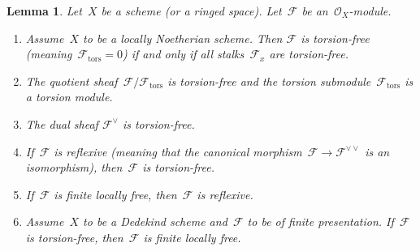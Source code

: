 \documentclass[10pt,reqno,a4paper]{amsbook}
\theoremstyle{definition}
\theoremstyle{plain}
\newtheorem{lemma}[defn]{Lemma}
\theoremstyle{remark}
\newcommand{\F}{\mathcal{F}}
\renewcommand{\O}{\mathcal{O}}
\newcommand{\tors}{\mathrm{tors}}
\newcommand{\?}{\,{:}\,}
\renewcommand{\_}{\mathpunct{.}\,}
\begin{document}
\begin{lemma}\label{lemma:torsion-stuff}
Let~$X$ be a scheme (or a ringed space). Let~$\F$ be
an~$\O_X$-module.
\begin{enumerate}
\item Assume~$X$ to be a locally Noetherian scheme. Then $\F$ is torsion-free
(meaning~$\F_\tors = 0$) if and only if all stalks~$\F_x$ are torsion-free.
\item The quotient sheaf~$\F/\F_\tors$ is torsion-free and the torsion
submodule~$\F_\tors$ is a torsion module.
\item The dual sheaf $\F^\vee$ is torsion-free.
\item If~$\F$ is reflexive (meaning that the canonical morphism~$\F \to
\F^{\vee\vee}$ is an isomorphism), then~$\F$ is torsion-free.
\item If~$\F$ is finite locally free, then~$\F$ is reflexive.
\item Assume~$X$ to be a Dedekind scheme and~$\F$ to be of finite presentation.
If~$\F$ is torsion-free, then~$\F$ is finite locally free.
\end{enumerate}
\end{lemma}
\end{document}
